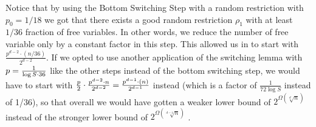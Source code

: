 % 
% 
% 
% 
% 
% 
% 
% 
% 
% 
% 
% 
% 
% 
% 
% 
 


\begin{note}\label{note:bottom-explanation}
Notice that by  using the Bottom Switching Step with a random restriction with $p_0=1/18$ we got that there exists a good random restriction $\rho_1$ with at least $1/36$ fraction of free variables.  In other words, we  reduce the number of free variable only by a constant factor in this step. This allowed us in  to start with $\frac{p^{d-2} \cdot (n/36)}{2^{d-2}} $. If we opted to use another application of the switching lemma with $p=\frac{1}{\log S\cdot 36}$ like the other steps instead of the bottom switching step, we would have to start with  $\frac{p}{2} \cdot \frac{p^{d-2} \cdot n}{2^{d-2}} = 
\frac{p^{d-1} \cdot (n)}{2^{d-1}}  $ instead (which is a  factor of $\frac{1}{72\log S}$ instead of 1/36), so that overall we would have gotten a weaker lower bound of $2^{\Omega(\sqrt[d]n)}$ instead of the stronger lower bound of $2^{\Omega(\sqrt[d-1]n)}$ .
\end{note}



